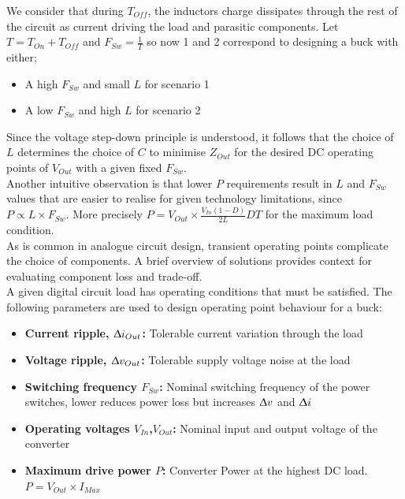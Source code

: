\documentclass[letterpaper,twocolumn,10pt]{article}
\begin{document}
We consider that during $T_{Off}$, the inductors charge dissipates through the rest of the circuit as current driving the load and parasitic components. Let $T = T_{On}+T_{Off}$ and $F_{Sw} = \frac{1}{T}$ so now 1 and 2 correspond to designing a buck with either;\\
\begin{itemize} %
\item{A high $F_{Sw}$ and small $L$ for scenario 1}
\item{A low $F_{Sw}$ and high $L$ for scenario 2}
\end{itemize}
Since the voltage step-down principle is understood, it follows that the choice of $L$ determines the choice of $C$ to minimise $Z_{Out}$ for the desired DC operating points of $V_{Out}$ with a given fixed $F_{Sw}$.\\
Another intuitive observation is that lower $P$ requirements result in $L$ and $F_{Sw}$ values that are easier to realise for given technology limitations, since $P \propto L\times F_{Sw}$. More precisely $P = V_{Out}\times \frac{V_{In}(1 - D)}{2L}DT$ for the maximum load condition.\\ %
\indent As is common in analogue circuit design, transient operating points complicate the choice of components. A brief overview of solutions provides context for evaluating component loss and trade-off.\\ %
A given digital circuit load has operating conditions that must be satisfied. The following parameters are used to design operating point behaviour for a buck: %
\begin{itemize}
\item {\textbf{Current ripple, $\Updelta i_{Out}$: }Tolerable current variation through the load}
\item {\textbf{Voltage ripple, $\Updelta v_{Out}$: }Tolerable supply voltage noise at the load}
\item {\textbf{Switching frequency $F_{Sw}$: }Nominal switching frequency of the power switches, lower reduces power loss but increases $\Updelta v$ and $\Updelta i$}
\item {\textbf{Operating voltages $V_{In}$,$V_{Out}$: }Nominal input and output voltage of the converter}
\item {\textbf{Maximum drive power $P$: }Converter Power at the highest DC load. $P = V_{Out}\times I_{Max}$} 
\end{itemize}   
\end{document}
